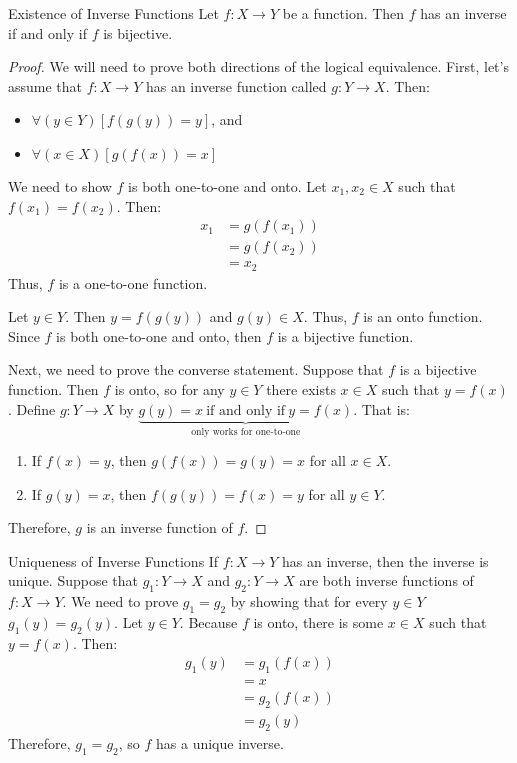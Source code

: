 \documentclass[letterpaper,12pt]{report}
\begin{document}
\begin{thmbox}{Existence of Inverse Functions}{}
	Let $f : X \to Y$ be a function. Then $f$ has an inverse if and only if $f$ is bijective.
	\tcblower
	\begin{proof}
		We will need to prove both directions of the logical equivalence. First, let's assume that $f : X \to Y$ has an inverse function called $g : Y \to X$. Then:
		\begin{itemize}
			\item $\forall(y \in Y)\left[ f(g(y)) = y \right]$, and
			\item $\forall(x \in X)\left[ g(f(x)) = x \right]$
		\end{itemize}
		We need to show $f$ is both one-to-one and onto. Let $x_1, x_2 \in X$ such that $f(x_1) = f(x_2)$. Then:
		\begin{align*}
			x_1 &= g(f(x_1)) \\
			&= g(f(x_2)) \\
			&= x_2
		\end{align*}
		Thus, $f$ is a one-to-one function.

		Let $y \in Y$. Then $y = f(g(y))$ and $g(y) \in X$. Thus, $f$ is an onto function. Since $f$ is both one-to-one and onto, then $f$ is a bijective function.

		Next, we need to prove the converse statement. Suppose that $f$ is a bijective function. Then $f$ is onto, so for any $y \in Y$ there exists $x \in X$ such that $y = f(x)$. Define $g : Y \to X$ by $\underbrace{g(y)=x\ \text{if and only if}\ y=f(x)}_{\text{only works for one-to-one}}$. That is:
		\begin{enumerate}
			\item If $f(x) = y$, then $g(f(x)) = g(y) = x$ for all $x \in X$.
			\item If $g(y) = x$, then $f(g(y)) = f(x) = y$ for all $y \in Y$.
		\end{enumerate}
		Therefore, $g$ is an inverse function of $f$.
	\end{proof}
\end{thmbox}

\begin{thmbox}{Uniqueness of Inverse Functions}{}
	If $f : X \to Y$ has an inverse, then the inverse is unique.
	\tcblower
	Suppose that $g_1 : Y \to X$ and $g_2 : Y \to X$ are both inverse functions of $f : X \to Y$. We need to prove $g_1 = g_2$ by showing that for every $y \in Y$ $g_1(y) = g_2(y)$. Let $y \in Y$. Because $f$ is onto, there is some $x \in X$ such that $y = f(x)$. Then:
	\begin{align*}
		g_1(y) &= g_1(f(x)) \\
		&= x \\
		&= g_2(f(x)) \\
		&= g_2(y)
	\end{align*}
	Therefore, $g_1 = g_2$, so $f$ has a unique inverse.
\end{thmbox}
\end{document}
